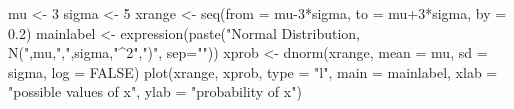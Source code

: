 \begin{Schunk}
\begin{Sinput}
 mu <- 3
 sigma <- 5
 xrange <- seq(from = mu-3*sigma, to = mu+3*sigma, by = 0.2)
 mainlabel <- expression(paste("Normal Distribution, N(",mu,",",sigma,"^2",")", sep=""))
 xprob <- dnorm(xrange, mean = mu, sd = sigma, log = FALSE)
 plot(xrange, xprob, type = "l", main = mainlabel, xlab = "possible values of x", ylab = "probability of x")
 
\end{Sinput}
\end{Schunk}
